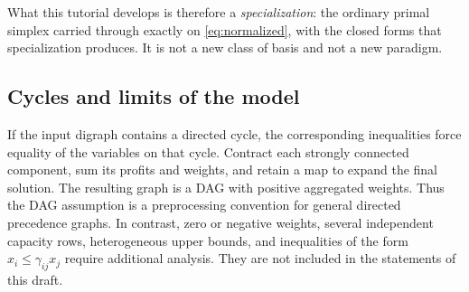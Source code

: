What this tutorial develops is therefore a \emph{specialization}: the ordinary
primal simplex carried through exactly on \eqref{eq:normalized}, with the closed
forms that specialization produces. It is not a new class of basis and not a
new paradigm.

\subsection{Cycles and limits of the model}
If the input digraph contains a directed cycle, the corresponding inequalities
force equality of the variables on that cycle. Contract each strongly
connected component, sum its profits and weights, and retain a map to expand
the final solution. The resulting graph is a DAG with positive aggregated
weights. Thus the DAG assumption is a preprocessing convention for general
directed precedence graphs. In contrast, zero or negative weights, several
independent capacity rows, heterogeneous upper bounds, and inequalities of
the form $x_i\le\gamma_{ij}x_j$ require additional analysis. They are not
included in the statements of this draft.
